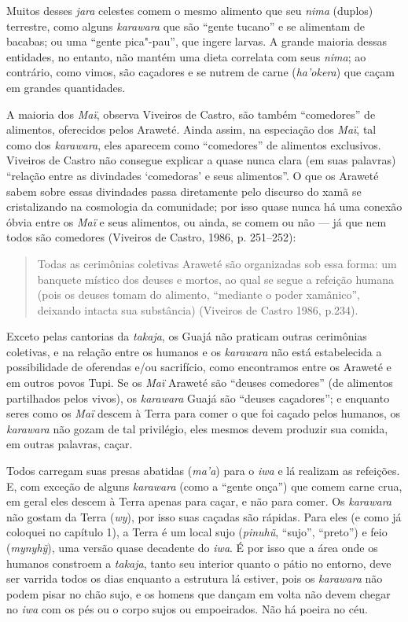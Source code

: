 Muitos desses \emph{jara} celestes comem o mesmo alimento que seu
\emph{nima} (duplos) terrestre, como alguns \emph{karawara} que são
``gente tucano'' e se alimentam de bacabas; ou uma ``gente pica"-pau'',
que ingere larvas. A grande maioria dessas entidades, no entanto, não
mantém uma dieta correlata com seus \emph{nima}; ao contrário, como
vimos, são caçadores e se nutrem de carne (\emph{ha'okera}) que caçam em
grandes quantidades.

A maioria dos \emph{Maï}, observa Viveiros de Castro, são também
``comedores'' de alimentos, oferecidos pelos Araweté. Ainda assim, na
especiação dos \emph{Maï}, tal como dos \emph{karawara}, eles aparecem
como ``comedores'' de alimentos exclusivos. Viveiros de Castro não
consegue explicar a quase nunca clara (em suas palavras) ``relação entre
as divindades `comedoras' e seus alimentos''. O que os Araweté sabem
sobre essas divindades passa diretamente pelo discurso do xamã se
cristalizando na cosmologia da comunidade; por isso quase nunca há uma
conexão óbvia entre os \emph{Maï} e seus alimentos, ou ainda, se comem
ou não --- já que nem todos são comedores (Viveiros de Castro, 1986, p.
251--252):

\begin{quote}
Todas as cerimônias coletivas Araweté são organizadas sob essa forma: um
banquete místico dos deuses e mortos, ao qual se segue a refeição humana
(pois os deuses tomam do alimento, ``mediante o poder xamânico'', deixando
intacta sua substância) (Viveiros de Castro 1986, p.234).
\end{quote}

Exceto pelas cantorias da \emph{takaja}, os Guajá não praticam outras
cerimônias coletivas, e na relação entre os humanos e os \emph{karawara}
não está estabelecida a possibilidade de oferendas e/ou sacrifício, como
encontramos entre os Araweté e em outros povos Tupi. Se os \emph{Maï}
Araweté são ``deuses comedores'' (de alimentos partilhados pelos vivos),
os \emph{karawara} Guajá são ``deuses caçadores''; e enquanto seres como
os \emph{Maï} descem à Terra para comer o que foi caçado pelos humanos,
os \emph{karawara} não gozam de tal privilégio, eles mesmos devem
produzir sua comida, em outras palavras, caçar.

Todos carregam suas presas abatidas (\emph{ma'a}) para o \emph{iwa} e lá
realizam as refeições. E, com exceção de alguns \emph{karawara} (como a
``gente onça'') que comem carne crua, em geral eles descem à Terra
apenas para caçar, e não para comer. Os \emph{karawara} não gostam da
Terra (\emph{wy}), por isso suas caçadas são rápidas. Para eles (e como
já coloquei no capítulo 1), a Terra é um local sujo (\emph{pinuhũ},
``sujo'', ``preto'') e feio (\emph{mynyhỹ}), uma versão quase decadente do
\emph{iwa}. É por isso que a área onde os humanos constroem a
\emph{takaja}, tanto seu interior quanto o pátio no entorno, deve ser
varrida todos os dias enquanto a estrutura lá estiver, pois os
\emph{karawara} não podem pisar no chão sujo, e os homens que dançam em
volta não devem chegar no \emph{iwa} com os pés ou o corpo sujos ou
empoeirados. Não há poeira no céu.

